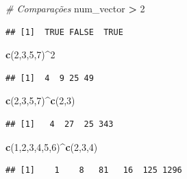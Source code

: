 \documentclass[
]{book}
\newenvironment{Shaded}{\begin{snugshade}}{\end{snugshade}}
\newcommand{\CommentTok}[1]{\textcolor[rgb]{0.56,0.35,0.01}{\textit{#1}}}
\newcommand{\DecValTok}[1]{\textcolor[rgb]{0.00,0.00,0.81}{#1}}
\newcommand{\FunctionTok}[1]{\textcolor[rgb]{0.13,0.29,0.53}{\textbf{#1}}}
\newcommand{\NormalTok}[1]{#1}
\newcommand{\SpecialCharTok}[1]{\textcolor[rgb]{0.81,0.36,0.00}{\textbf{#1}}}
\theoremstyle{definition}
\theoremstyle{definition}
\theoremstyle{definition}
\theoremstyle{definition}
\theoremstyle{remark}
\begin{document}
\begin{Shaded}
\begin{Highlighting}[]
\CommentTok{\# Comparações}
\NormalTok{num\_vector }\SpecialCharTok{\textgreater{}} \DecValTok{2}  
\end{Highlighting}
\end{Shaded}

\begin{verbatim}
## [1]  TRUE FALSE  TRUE
\end{verbatim}

\begin{Shaded}
\begin{Highlighting}[]
\FunctionTok{c}\NormalTok{(}\DecValTok{2}\NormalTok{,}\DecValTok{3}\NormalTok{,}\DecValTok{5}\NormalTok{,}\DecValTok{7}\NormalTok{)}\SpecialCharTok{\^{}}\DecValTok{2}
\end{Highlighting}
\end{Shaded}

\begin{verbatim}
## [1]  4  9 25 49
\end{verbatim}

\begin{Shaded}
\begin{Highlighting}[]
\FunctionTok{c}\NormalTok{(}\DecValTok{2}\NormalTok{,}\DecValTok{3}\NormalTok{,}\DecValTok{5}\NormalTok{,}\DecValTok{7}\NormalTok{)}\SpecialCharTok{\^{}}\FunctionTok{c}\NormalTok{(}\DecValTok{2}\NormalTok{,}\DecValTok{3}\NormalTok{)}
\end{Highlighting}
\end{Shaded}

\begin{verbatim}
## [1]   4  27  25 343
\end{verbatim}

\begin{Shaded}
\begin{Highlighting}[]
\FunctionTok{c}\NormalTok{(}\DecValTok{1}\NormalTok{,}\DecValTok{2}\NormalTok{,}\DecValTok{3}\NormalTok{,}\DecValTok{4}\NormalTok{,}\DecValTok{5}\NormalTok{,}\DecValTok{6}\NormalTok{)}\SpecialCharTok{\^{}}\FunctionTok{c}\NormalTok{(}\DecValTok{2}\NormalTok{,}\DecValTok{3}\NormalTok{,}\DecValTok{4}\NormalTok{)}
\end{Highlighting}
\end{Shaded}

\begin{verbatim}
## [1]    1    8   81   16  125 1296
\end{verbatim}
\end{document}
